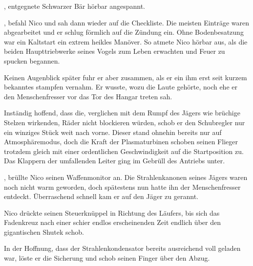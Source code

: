 \par

, entgegnete Schwarzer Bär hörbar angespannt. 

\par

, befahl Nico und sah dann wieder auf die Checkliste. Die meisten Einträge waren abgearbeitet und er schlug förmlich auf die Zündung ein. Ohne Bodenbesatzung war ein Kaltstart ein extrem heikles Manöver. So atmete Nico hörbar aus, als die beiden Haupttriebwerke seines Vogels zum Leben erwachten und Feuer zu spucken begannen.

\par

Keinen Augenblick später fuhr er aber zusammen, als er ein ihm erst seit kurzem bekanntes stampfen vernahm. Er wusste, wozu die Laute gehörte, noch ehe er den Menschenfresser vor das Tor des Hangar treten sah.

\par

Inständig hoffend, dass die, verglichen mit dem Rumpf des Jägers wie brüchige Stelzen wirkenden, Räder nicht blockieren würden, schob er den Schubregler nur ein winziges Stück weit nach vorne. Dieser stand ohnehin bereits nur auf Atmosphäremodus, doch die Kraft der Plasmaturbinen schoben seinen Flieger trotzdem gleich mit einer ordentlichen Geschwindigkeit auf die Startposition zu. Das Klappern der umfallenden Leiter ging im Gebrüll des Antriebs unter.

\par

, brüllte Nico seinen Waffenmonitor an. Die Strahlenkanonen seines Jägers waren noch nicht warm geworden, doch spätestens nun hatte ihn der Menschenfresser entdeckt. Überraschend schnell kam er auf den Jäger zu gerannt.

\par

Nico drückte seinen Steuerknüppel in Richtung des Läufers, bis sich das Fadenkreuz nach einer schier endlos erscheinenden Zeit endlich über den gigantischen Shutek schob.

\par

In der Hoffnung, dass der Strahlenkondensator bereits ausreichend voll geladen war, löste er die Sicherung und schob seinen Finger über den Abzug. 

